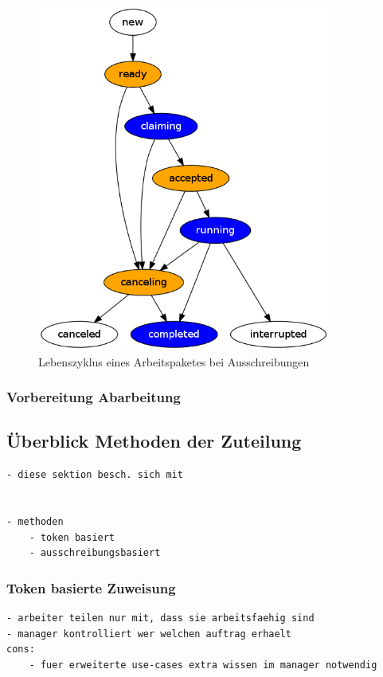 \begin{figure}[ht] 
  \centering
  \label{fig:lebenszyklus-arbeitspaket}
  \includegraphics[height=4.5in]{imageinput/lebenszyklus-arbeitspaket.png}
  \caption{Lebenszyklus eines Arbeitspaketes bei Ausschreibungen}
\end{figure}


\subsubsection{Vorbereitung Abarbeitung}

\subsection{Überblick Methoden der Zuteilung}


\begin{verbatim}
- diese sektion besch. sich mit


- methoden
    - token basiert
    - ausschreibungsbasiert

\end{verbatim}


\subsubsection{Token basierte Zuweisung}

\begin{verbatim}
- arbeiter teilen nur mit, dass sie arbeitsfaehig sind
- manager kontrolliert wer welchen auftrag erhaelt
cons:
    - fuer erweiterte use-cases extra wissen im manager notwendig
\end{verbatim}

